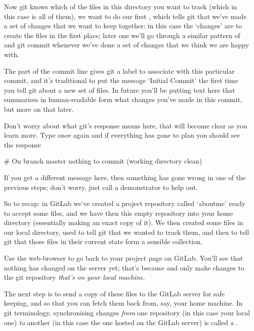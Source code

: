 Now git knows which of the files in this directory you want to track (which in this case is all of them), we want to do our first , which tells git that we've made a set of changes that we want to keep together: in this case the `changes' are to create the files in the first place; later one we'll go through a similar pattern of  and {git commit} whenever we've done a set of changes that we think we are happy with. 

The  part of the commit line gives git a label to associate with this particular commit, and it's traditional to put the message `Initial Commit' the first time you tell git about a new set of files. In future you'll be putting text here that summarises in human-readable form what changes you've made in this commit, but more on that later.


Don't worry about what git's response means here, that will become clear as you learn more. Type  once again and if everything has gone to plan you should see the response

\begin{ttoutenv}
# On branch master
nothing to commit (working directory clean)
\end{ttoutenv}

If you get a different message here, then something has gone wrong in one of the previous steps; don't worry, just call a demonstrator to help out. 

So to recap: in GitLab we've created a project repository called `aboutme' ready to accept some files, and we have then  this empty repository into your home directory (essentially making an exact copy of it). We then created some files in our local directory, used  to tell git that we wanted to track them, and then  to tell git that those files in their current state form a sensible collection. 

Use the web-browser to go back to your  project page on GitLab. You'll see that nothing has changed on the server yet; that's because  and  only make changes to the git repository \emph{that's on your local machine}.

The next step is to send a copy of these files to the GitLab server for safe keeping, and so that you can fetch them back from, say, your home machine. In git terminology, synchronising changes \emph{from} one repository (in this case your local one) \emph{to} another (in this case the one hosted on the GitLab server) is called a . 

